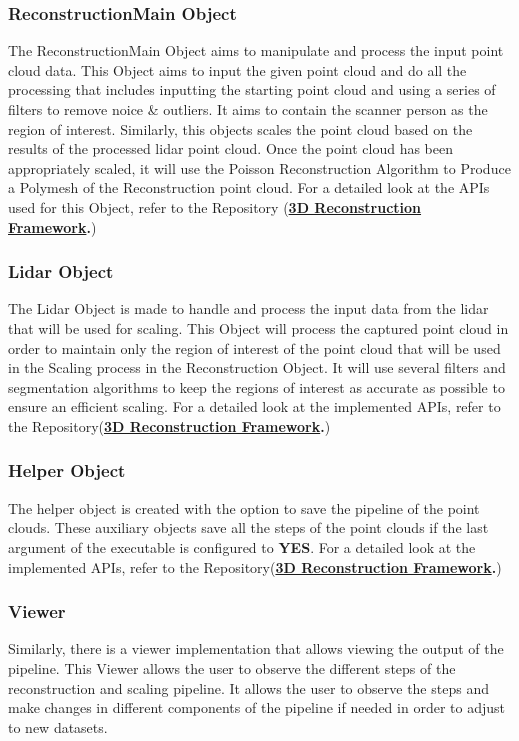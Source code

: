 \documentclass[12pt]{report}
\begin{document}
\subsubsection*{ReconstructionMain Object}
The ReconstructionMain Object aims to manipulate and process the input point cloud data.
This Object aims to input the given point cloud and do all the processing that includes inputting the starting point cloud and using a series of filters to remove noice \& outliers. It aims to contain the scanner person as the region of interest. 
Similarly, this objects scales the point cloud based on the results of the processed lidar point cloud.
Once the point cloud has been appropriately scaled, it will use the Poisson Reconstruction Algorithm to Produce a Polymesh of the Reconstruction point cloud.
For a detailed look at the APIs used for this Object, refer to the Repository (\textbf{\href{https://github.com/esteban-andrade/3D-Reconstructrion-Scanner} {3D Reconstruction Framework}.})

\subsubsection*{Lidar Object}
The Lidar Object is made to handle and process the input data from the lidar that will be used for scaling. 
This Object will process the captured point cloud in order to maintain only the region of interest of the point cloud that will be used in the Scaling process in the Reconstruction Object. 
It will use several filters and segmentation algorithms to keep the regions of interest as accurate as possible to ensure an efficient scaling.
For a detailed look at the implemented APIs, refer to the Repository(\textbf{\href{https://github.com/esteban-andrade/3D-Reconstructrion-Scanner} {3D Reconstruction Framework}.})

\subsubsection*{Helper Object}
The helper object is created with the option to save the pipeline of the point clouds. These auxiliary objects save all the steps of the point clouds if the last argument of the executable is configured to \textbf{YES}.
For a detailed look at the implemented APIs, refer to the Repository(\textbf{\href{https://github.com/esteban-andrade/3D-Reconstructrion-Scanner} {3D Reconstruction Framework}.})




\subsubsection*{Viewer}
Similarly, there is a viewer implementation that allows viewing the output of the pipeline. This Viewer allows the user to observe the different steps of the reconstruction and scaling pipeline.
It allows the user to observe the steps and make changes in different components of the pipeline if needed in order to adjust to new datasets.
\end{document}
